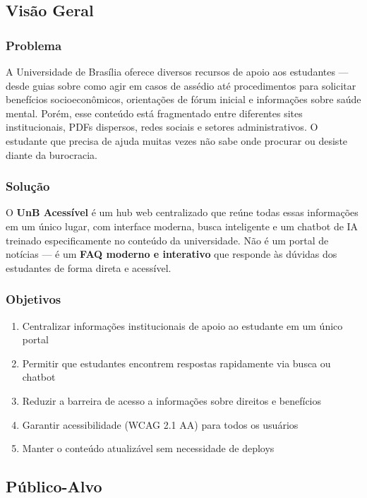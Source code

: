 \documentclass[12pt, a4paper]{article}
\begin{document}
\subsection{Visão Geral}

\subsubsection{Problema}

A Universidade de Brasília oferece diversos recursos de apoio aos estudantes — desde guias sobre como agir em casos de assédio até procedimentos para solicitar benefícios socioeconômicos, orientações de fórum inicial e informações sobre saúde mental. Porém, esse conteúdo está fragmentado entre diferentes sites institucionais, PDFs dispersos, redes sociais e setores administrativos. O estudante que precisa de ajuda muitas vezes não sabe onde procurar ou desiste diante da burocracia.

\subsubsection{Solução}

O \textbf{UnB Acessível} é um hub web centralizado que reúne todas essas informações em um único lugar, com interface moderna, busca inteligente e um chatbot de IA treinado especificamente no conteúdo da universidade. Não é um portal de notícias — é um \textbf{FAQ moderno e interativo} que responde às dúvidas dos estudantes de forma direta e acessível.

\subsubsection{Objetivos}

\begin{enumerate}
  \item Centralizar informações institucionais de apoio ao estudante em um único portal
  \item Permitir que estudantes encontrem respostas rapidamente via busca ou chatbot
  \item Reduzir a barreira de acesso a informações sobre direitos e benefícios
  \item Garantir acessibilidade (WCAG 2.1 AA) para todos os usuários
  \item Manter o conteúdo atualizável sem necessidade de deploys
\end{enumerate}

\subsection{Público-Alvo}
\end{document}
